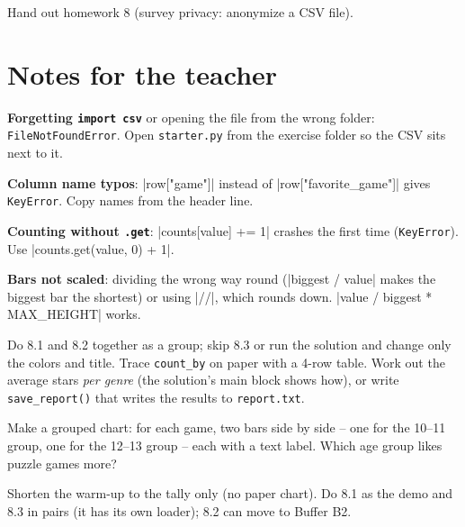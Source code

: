 Hand out homework 8 (survey privacy: anonymize a CSV file).

\section{Notes for the teacher}
\begin{commonmistakes}
  \item \textbf{Forgetting \texttt{import csv}} or opening the file from the wrong folder: \texttt{FileNotFoundError}. Open \texttt{starter.py} from the exercise folder so the CSV sits next to it.
  \item \textbf{Column name typos}: \py|row["game"]| instead of \py|row["favorite_game"]| gives \texttt{KeyError}. Copy names from the header line.
  \item \textbf{Counting without \texttt{.get}}: \py|counts[value] += 1| crashes the first time (\texttt{KeyError}). Use \py|counts.get(value, 0) + 1|.
  \item \textbf{Bars not scaled}: dividing the wrong way round (\py|biggest / value| makes the biggest bar the shortest) or using \py|//|, which rounds down. \py|value / biggest * MAX_HEIGHT| works.
\end{commonmistakes}

\begin{differentiation}
\supportpath Do 8.1 and 8.2 together as a group; skip 8.3 or run the solution and change only the colors and title. Trace \texttt{count\_by} on paper with a 4-row table.
\extensionpath Work out the average stars \emph{per genre} (the solution's main block shows how), or write \texttt{save\_report()} that writes the results to \texttt{report.txt}.
\end{differentiation}

\begin{stretchchallenge}
Make a grouped chart: for each game, two bars side by side -- one for the 10--11 group, one for the 12--13 group -- each with a text label. Which age group likes puzzle games more?
\end{stretchchallenge}

\begin{teachernote}
Shorten the warm-up to the tally only (no paper chart). Do 8.1 as the demo and 8.3 in pairs (it has its own loader); 8.2 can move to Buffer B2.
\end{teachernote}
